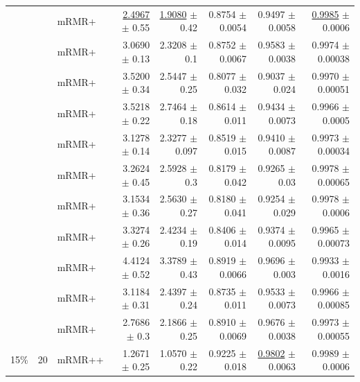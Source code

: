 \begin{longtable}{llp{}rrrrr}
 &  & mRMR+ & \underline{2.4967} {\scriptsize $\pm$ 0.55} & \underline{1.9080} {\scriptsize $\pm$ 0.42} & 0.8754 {\scriptsize $\pm$ 0.0054} & 0.9497 {\scriptsize $\pm$ 0.0058} & \underline{0.9985} {\scriptsize $\pm$ 0.0006} \\
 &  & mRMR+ & 3.0690 {\scriptsize $\pm$ 0.13} & 2.3208 {\scriptsize $\pm$ 0.1} & 0.8752 {\scriptsize $\pm$ 0.0067} & 0.9583 {\scriptsize $\pm$ 0.0038} & 0.9974 {\scriptsize $\pm$ 0.00038} \\
 &  & mRMR+ & 3.5200 {\scriptsize $\pm$ 0.34} & 2.5447 {\scriptsize $\pm$ 0.25} & 0.8077 {\scriptsize $\pm$ 0.032} & 0.9037 {\scriptsize $\pm$ 0.024} & 0.9970 {\scriptsize $\pm$ 0.00051} \\
 &  & mRMR+ & 3.5218 {\scriptsize $\pm$ 0.22} & 2.7464 {\scriptsize $\pm$ 0.18} & 0.8614 {\scriptsize $\pm$ 0.011} & 0.9434 {\scriptsize $\pm$ 0.0073} & 0.9966 {\scriptsize $\pm$ 0.0005} \\
 &  & mRMR+ & 3.1278 {\scriptsize $\pm$ 0.14} & 2.3277 {\scriptsize $\pm$ 0.097} & 0.8519 {\scriptsize $\pm$ 0.015} & 0.9410 {\scriptsize $\pm$ 0.0087} & 0.9973 {\scriptsize $\pm$ 0.00034} \\
 &  & mRMR+ & 3.2624 {\scriptsize $\pm$ 0.45} & 2.5928 {\scriptsize $\pm$ 0.3} & 0.8179 {\scriptsize $\pm$ 0.042} & 0.9265 {\scriptsize $\pm$ 0.03} & 0.9978 {\scriptsize $\pm$ 0.00065} \\
 &  & mRMR+ & 3.1534 {\scriptsize $\pm$ 0.36} & 2.5630 {\scriptsize $\pm$ 0.27} & 0.8180 {\scriptsize $\pm$ 0.041} & 0.9254 {\scriptsize $\pm$ 0.029} & 0.9978 {\scriptsize $\pm$ 0.0006} \\
 &  & mRMR+ & 3.3274 {\scriptsize $\pm$ 0.26} & 2.4234 {\scriptsize $\pm$ 0.19} & 0.8406 {\scriptsize $\pm$ 0.014} & 0.9374 {\scriptsize $\pm$ 0.0095} & 0.9965 {\scriptsize $\pm$ 0.00073} \\
 &  & mRMR+ & 4.4124 {\scriptsize $\pm$ 0.52} & 3.3789 {\scriptsize $\pm$ 0.43} & 0.8919 {\scriptsize $\pm$ 0.0066} & 0.9696 {\scriptsize $\pm$ 0.003} & 0.9933 {\scriptsize $\pm$ 0.0016} \\
 &  & mRMR+ & 3.1184 {\scriptsize $\pm$ 0.31} & 2.4397 {\scriptsize $\pm$ 0.24} & 0.8735 {\scriptsize $\pm$ 0.011} & 0.9533 {\scriptsize $\pm$ 0.0073} & 0.9966 {\scriptsize $\pm$ 0.00085} \\
 &  & mRMR+ & 2.7686 {\scriptsize $\pm$ 0.3} & 2.1866 {\scriptsize $\pm$ 0.25} & 0.8910 {\scriptsize $\pm$ 0.0069} & 0.9676 {\scriptsize $\pm$ 0.0038} & 0.9973 {\scriptsize $\pm$ 0.00055} \\
\midrule
15\% & 20 & mRMR++ & 1.2671 {\scriptsize $\pm$ 0.25} & 1.0570 {\scriptsize $\pm$ 0.22} & 0.9225 {\scriptsize $\pm$ 0.018} & \underline{0.9802} {\scriptsize $\pm$ 0.0063} & 0.9989 {\scriptsize $\pm$ 0.0006} \\

\end{longtable}
